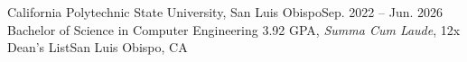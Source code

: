 \resumeSubheading
      {California Polytechnic State University, San Luis Obispo}{Sep. 2022 -- Jun. 2026}
      {Bachelor of Science in Computer Engineering \textbar{} 3.92 GPA, \textit{Summa Cum Laude}, 12x Dean's List}{San Luis Obispo, CA}
